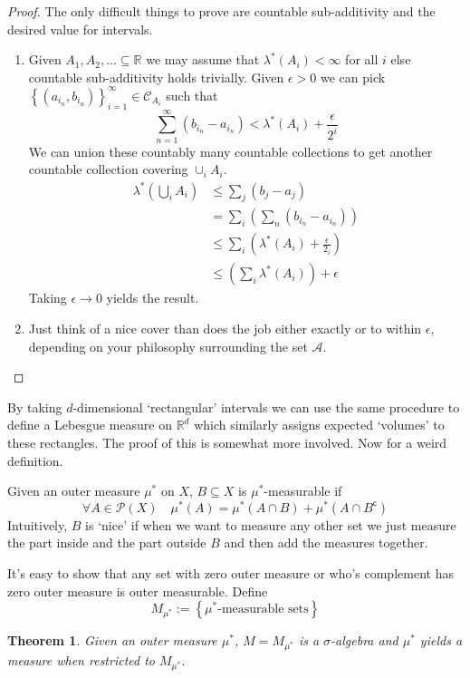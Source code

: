 \documentclass[11pt]{article}
\newcommand{\defeq}{:=}
\newcommand{\sigal}{$\sigma$-algebra}
\newcommand{\stcmp}{^{\mathsf{c}}}
\newcommand{\pow}[1]{\mathcal{P}(#1)}
\newcommand{\R}{\mathbb{R}}
\newenvironment{defin}
	{\begin{mdframed}[backgroundcolor=white, roundcorner=5pt, linewidth=1pt]}
	{\end{mdframed}}
\newcommand{\mdf}[1]{{\color{red} #1}}
\newtheorem{theorem}{Theorem}[section]
\begin{document}
\begin{proof}
The only difficult things to prove are countable sub-additivity and the desired value for intervals.
\begin{enumerate}[label=(\roman*)]
	\item Given $A_1,A_2, \dots\subseteq\R$ we may assume that $\lambda^*(A_i)<\infty$ for all $i$ else countable sub-additivity holds trivially.
		Given $\epsilon >0$ we can pick $\left\{(a_{i_n},b_{i_n})\right\}_{i=1}^\infty\in\mathcal{C}_{A_i}$ such that 
		$$\sum_{n=1}^\infty (b_{i_n}-a_{i_n})< \lambda^*(A_i)+\frac{\epsilon}{2^i}$$
		We can union these countably many countable collections to get another countable collection covering $\cup_i A_i$.
		\begin{align*}
			\lambda^*\left(\bigcup_i A_i\right)&\leq \sum_j(b_j-a_j)\\
											   &=\sum_i\left(\sum_n\left(b_{i_n}-a_{i_n}\right)\right)\\
											   &\leq\sum_i\left(\lambda^*(A_i)+\frac{\epsilon}{2_i}\right)\\
											   &\leq\left(\sum_i\lambda^*(A_i)\right)+\epsilon
		\end{align*}
		Taking $\epsilon\to 0$ yields the result.
	\item Just think of a nice cover than does the job either exactly or to within $\epsilon$, depending on your philosophy surrounding the set $\mathcal{A}$.
\end{enumerate}
\end{proof}
By taking $d$-dimensional `rectangular' intervals we can use the same procedure to define a Lebesgue measure on $\R^d$ which similarly assigns expected `volumes' to these rectangles.
The proof of this is somewhat more involved.
Now for a weird definition.
\begin{defin}
Given an outer measure $\mu^*$ on $X$, $B\subseteq X$ is \mdf{$\mu^*$-measurable} if
\[
	\forall A \in \pow{X} \quad \mu^*(A)=\mu^*(A\cap B)+\mu^*(A\cap B\stcmp)
\]
Intuitively, $B$ is `nice' if when we want to measure any other set we just measure the part inside and the part outside $B$ and then add the measures together.
\end{defin}
It's easy to show that any set with zero outer measure or who's complement has zero outer measure is outer measurable.
Define 
\[
	M_{\mu^*}\defeq\left\{\mu^*\text{-measurable sets}\right\}
\]
\begin{theorem}
	Given an outer measure $\mu^*$, $M=M_{\mu^*}$ is a {\sigal} and $\mu^*$ yields a measure when restricted to $M_{\mu^*}$.
\end{theorem}
\end{document}
